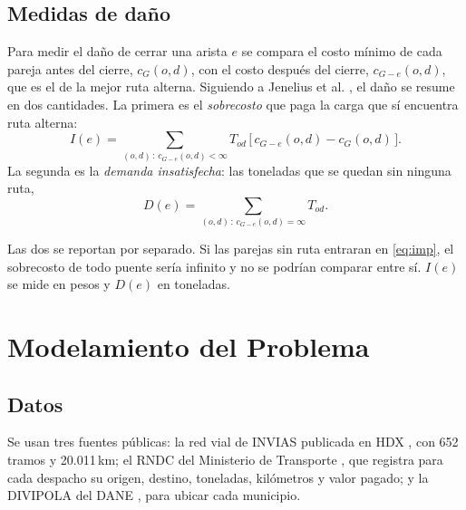 \documentclass[conference]{IEEEtran}
\begin{document}
\subsection{Medidas de daño}
\label{sub:dano}

Para medir el daño de cerrar una arista $e$ se compara el costo mínimo de cada
pareja antes del cierre, $c_G(o,d)$, con el costo después del cierre,
$c_{G-e}(o,d)$, que es el de la mejor ruta alterna. Siguiendo a Jenelius et al.
\cite{jenelius2006}, el daño se resume en dos cantidades. La primera es el
\emph{sobrecosto} que paga la carga que sí encuentra ruta alterna:
\begin{equation}\label{eq:imp}
I(e)=\sum_{(o,d)\,:\,c_{G-e}(o,d)<\infty} T_{od}\,
\big[\,c_{G-e}(o,d)-c_G(o,d)\,\big].
\end{equation}
La segunda es la \emph{demanda insatisfecha}: las toneladas que se quedan sin
ninguna ruta,
\begin{equation}\label{eq:dem}
D(e)=\sum_{(o,d)\,:\,c_{G-e}(o,d)=\infty} T_{od} .
\end{equation}

Las dos se reportan por separado. Si las parejas sin ruta entraran en
\eqref{eq:imp}, el sobrecosto de todo puente sería infinito y no se podrían
comparar entre sí. $I(e)$ se mide en pesos y $D(e)$ en toneladas.


\section{Modelamiento del Problema}
\label{sec:modelo}

\subsection{Datos}
Se usan tres fuentes públicas: la red vial de INVIAS publicada en HDX
\cite{ocha_hdx_roads}, con 652 tramos y 20.011\,km; el RNDC del Ministerio de
Transporte \cite{rndc}, que registra para cada despacho su origen, destino,
toneladas, kilómetros y valor pagado; y la DIVIPOLA del DANE
\cite{dane_divipola}, para ubicar cada municipio.
\end{document}
